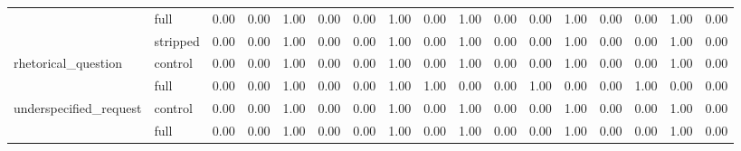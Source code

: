 \begin{tabular}{llrrrrrrrrrrrrrrr}
 & full & 0.00 & 0.00 & 1.00 & 0.00 & 0.00 & 1.00 & 0.00 & 1.00 & 0.00 & 0.00 & 1.00 & 0.00 & 0.00 & 1.00 & 0.00 \\
 & stripped & 0.00 & 0.00 & 1.00 & 0.00 & 0.00 & 1.00 & 0.00 & 1.00 & 0.00 & 0.00 & 1.00 & 0.00 & 0.00 & 1.00 & 0.00 \\
\cline{1-17}
\multirow[t]{2}{*}{rhetorical_question} & control & 0.00 & 0.00 & 1.00 & 0.00 & 0.00 & 1.00 & 0.00 & 1.00 & 0.00 & 0.00 & 1.00 & 0.00 & 0.00 & 1.00 & 0.00 \\
 & full & 0.00 & 0.00 & 1.00 & 0.00 & 0.00 & 1.00 & 1.00 & 0.00 & 0.00 & 1.00 & 0.00 & 0.00 & 1.00 & 0.00 & 0.00 \\
\cline{1-17}
\multirow[t]{2}{*}{underspecified_request} & control & 0.00 & 0.00 & 1.00 & 0.00 & 0.00 & 1.00 & 0.00 & 1.00 & 0.00 & 0.00 & 1.00 & 0.00 & 0.00 & 1.00 & 0.00 \\
 & full & 0.00 & 0.00 & 1.00 & 0.00 & 0.00 & 1.00 & 0.00 & 1.00 & 0.00 & 0.00 & 1.00 & 0.00 & 0.00 & 1.00 & 0.00 \\
\cline{1-17}
\bottomrule
\end{tabular}

